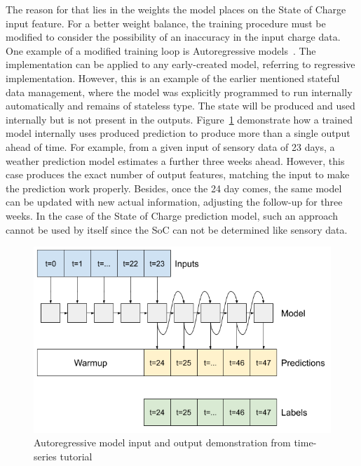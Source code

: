 %
%
The reason for that lies in the weights the model places on the State of Charge input feature.
For a better weight balance, the training procedure must be modified to consider the possibility of an inaccuracy in the input charge data.
One example of a modified training loop is Autoregressive models~\cite{time_2020}.
The implementation can be applied to any early-created model, referring to regressive implementation.
However, this is an example of the earlier mentioned stateful data management, where the model was explicitly programmed to run internally automatically and remains of stateless type.
The state will be produced and used internally but is not present in the outputs.
\mbox{Figure~\ref{fig:autoregressive}} demonstrate how a trained model internally uses produced prediction to produce more than a single output ahead of time.
For example, from a given input of sensory data of 23 days, a weather prediction model estimates a further three weeks ahead.
However, this case produces the exact number of output features, matching the input to make the prediction work properly.
Besides, once the 24 day comes, the same model can be updated with new actual information, adjusting the follow-up for three weeks.
In the case of the State of Charge prediction model, such an approach cannot be used by itself since the SoC can not be determined like sensory data.
\begin{figure}[htbp]%
    \centering
    \includegraphics[width=0.7\linewidth]{II_Body/images/multistep_autoregressive.png}
    \caption{Autoregressive model input and output demonstration from time-series tutorial~\cite{time_2020}}
    \label{fig:autoregressive}
\end{figure}

